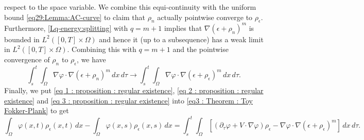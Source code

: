 \documentclass{amsart}
\numberwithin{equation}{section}
\begin{document}
respect to the space variable. We combine this equi-continuity with
the uniform bound \eqref{eq29:Lemma:AC-curve} to claim that $\rho_n$ actually pointwise converge to $\rho_\epsilon$.
Furthermore, \eqref{Lq-energy:splitting} with $q=m+1$ implies that
$\nabla(\epsilon + \rho_n)^{m}$ is bounded in $L^2([0,T]\times\Omega)$ and hence
it (up to a subsequence) has a weak limit in $L^2([0,T]\times\Omega)$.
Combining this with $q=m+1$ and the pointwise convergence of $\rho_n$ to
$\rho_\epsilon$, we have
\begin{equation}\label{eq 3 : proposition : regular existence}
\int_{s}^{t} \int_{\Omega}  \nabla \varphi \cdot \nabla(\epsilon + \rho_n
)^m    \,dx \,d\tau \longrightarrow \int_{s}^{t} \int_{\Omega}
\nabla \varphi \cdot \nabla (\epsilon + \rho_\epsilon)^m  \,dx \,d\tau.
\end{equation}
Finally, we put \eqref{eq 1 : proposition : regular existence},
\eqref{eq 2 : proposition : regular existence} and \eqref{eq 3 :
proposition : regular existence} into \eqref{eq3 : Theorem : Toy
Fokker-Plank} to get
\begin{equation*}\label{eq 4 : proposition : regular existence}
 \int_{\Omega}\varphi(x,t) \rho_\epsilon(x,t) \,dx - \int_{\Omega}\varphi(x,s) \rho_\epsilon(x,s)\,dx
=\int_{s}^{t} \int_{\Omega}  \left [ \left(\partial_\tau\varphi  + V
\cdot \nabla \varphi \right){\rho_\epsilon} -\nabla  \varphi \cdot \nabla (\epsilon + \rho_\epsilon)^m   \right ] \,dx\,d\tau.
\end{equation*}
\end{document}
